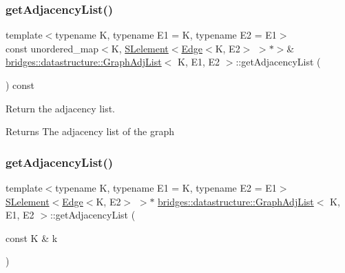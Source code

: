 \subsubsection{\texorpdfstring{get\+Adjacency\+List()}{getAdjacencyList()}\hspace{0.1cm}{\footnotesize\ttfamily [1/3]}}
{\footnotesize\ttfamily template$<$typename K, typename E1 = K, typename E2 = E1$>$ \\
const unordered\+\_\+map$<$K, \hyperlink{classbridges_1_1datastructure_1_1_s_lelement}{S\+Lelement}$<$\hyperlink{classbridges_1_1datastructure_1_1_edge}{Edge}$<$K, E2$>$ $>$$\ast$$>$\& \hyperlink{classbridges_1_1datastructure_1_1_graph_adj_list}{bridges\+::datastructure\+::\+Graph\+Adj\+List}$<$ K, E1, E2 $>$\+::get\+Adjacency\+List (\begin{DoxyParamCaption}{ }\end{DoxyParamCaption}) const\hspace{0.3cm}{\ttfamily [inline]}}



Return the adjacency list. 

\begin{DoxyReturn}{Returns}
The adjacency list of the graph 
\end{DoxyReturn}
\mbox{\label{classbridges_1_1datastructure_1_1_graph_adj_list_aa3df7d161ed7847a188b5818f78818d8}} 
\subsubsection{\texorpdfstring{get\+Adjacency\+List()}{getAdjacencyList()}\hspace{0.1cm}{\footnotesize\ttfamily [2/3]}}
{\footnotesize\ttfamily template$<$typename K, typename E1 = K, typename E2 = E1$>$ \\
\hyperlink{classbridges_1_1datastructure_1_1_s_lelement}{S\+Lelement}$<$\hyperlink{classbridges_1_1datastructure_1_1_edge}{Edge}$<$K, E2$>$ $>$$\ast$ \hyperlink{classbridges_1_1datastructure_1_1_graph_adj_list}{bridges\+::datastructure\+::\+Graph\+Adj\+List}$<$ K, E1, E2 $>$\+::get\+Adjacency\+List (\begin{DoxyParamCaption}\item[{const K \&}]{k }\end{DoxyParamCaption})\hspace{0.3cm}{\ttfamily [inline]}}




